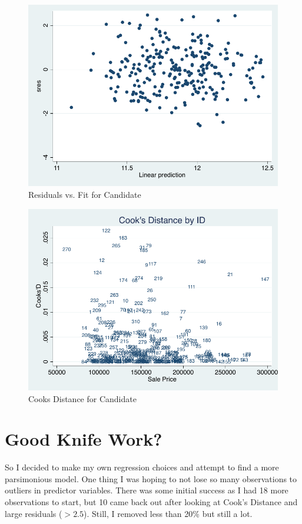 \documentclass[twocolumn,11pt]{article}
\begin{document}
\begin{figure}[H]
\centering
  \includegraphics[width=.9\linewidth]{figures/reg-man-rvf}
  \caption{Residuals vs. Fit for Candidate}
  \label{fig:reg-man-rvf}
\end{figure}
\begin{figure}[H]
\centering
  \includegraphics[width=.9\linewidth]{figures/reg-man-cooked}
  \caption{Cooks Distance for Candidate}
  \label{fig:reg-man-cooked}
\end{figure}


\section{Good Knife Work?}
So I decided to make my own regression choices and attempt to find a more parsimonious model.
One thing I was hoping to not lose so many observations to outliers in predictor variables.
There was some initial success as I had 18 more observations to start,
but 10 came back out after looking at Cook's Distance and large residuals ($>2.5$).
Still, I removed less than 20\% but still a lot.
\end{document}
